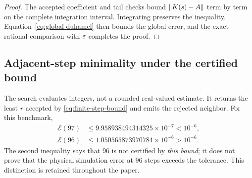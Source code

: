 \begin{proof}
The accepted coefficient and tail checks bound
$\left\lVert K(s)-A\right\rVert$ term by term on the complete integration interval.
Integrating preserves the inequality.  Equation~\eqref{eq:global-duhamel}
then bounds the global error, and the exact rational comparison with $\varepsilon$
completes the proof.
\end{proof}

\subsection{Adjacent-step minimality under the certified bound}

The search evaluates integers, not a rounded real-valued estimate.  It returns
the least $r$ accepted by \cref{eq:finite-step-bound} and emits the rejected
neighbor.  For this benchmark,
\begin{align}
 \mathcal E(97)&\leq9.958938494314325\times10^{-7}<10^{-6},\\
 \mathcal E(96)&\leq1.050565873970784\times10^{-6}>10^{-6}.
\end{align}
The second inequality says that 96 is not certified by \emph{this bound}; it
does not prove that the physical simulation error at 96 steps exceeds the
tolerance.  This distinction is retained throughout the paper.
